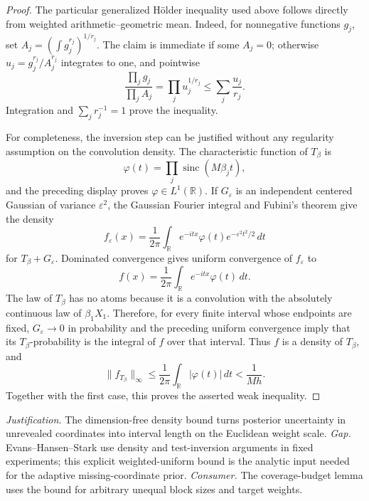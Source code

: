\documentclass{article}
\begin{document}
\begin{proof}
The particular generalized H\"older inequality used above follows directly from weighted arithmetic--geometric mean.  Indeed, for nonnegative functions \(g_j\), set \(A_j=(\int g_j^{r_j})^{1/r_j}\).  The claim is immediate if some \(A_j=0\); otherwise \(u_j=g_j^{r_j}/A_j^{r_j}\) integrates to one, and pointwise
\[
 \frac{\prod_jg_j}{\prod_jA_j}
 =\prod_ju_j^{1/r_j}
 \le\sum_j\frac{u_j}{r_j}.
\]
Integration and \(\sum_jr_j^{-1}=1\) prove the inequality.

For completeness, the inversion step can be justified without any regularity assumption on the convolution density.  The characteristic function of \(T_\beta\) is
\[
 \varphi(t)=\prod_j\operatorname{sinc}(M\beta_jt),
\]
and the preceding display proves \(\varphi\in L^1(\mathbb R)\).  If \(G_\varepsilon\) is an independent centered Gaussian of variance \(\varepsilon^2\), the Gaussian Fourier integral and Fubini's theorem give the density
\[
 f_\varepsilon(x)=\frac1{2\pi}\int_{\mathbb R}
 e^{-itx}\varphi(t)e^{-\varepsilon^2t^2/2}\,dt
\]
for \(T_\beta+G_\varepsilon\).  Dominated convergence gives uniform convergence of \(f_\varepsilon\) to
\[
 f(x)=\frac1{2\pi}\int_{\mathbb R}e^{-itx}\varphi(t)\,dt.
\]
The law of \(T_\beta\) has no atoms because it is a convolution with the absolutely continuous law of \(\beta_1X_1\).  Therefore, for every finite interval whose endpoints are fixed, \(G_\varepsilon\to0\) in probability and the preceding uniform convergence imply that its \(T_\beta\)-probability is the integral of \(f\) over that interval.  Thus \(f\) is a density of \(T_\beta\), and
\[
 \|f_{T_\beta}\|_\infty
 \le \frac1{2\pi}\int_{\mathbb R}|\varphi(t)|\,dt
 <\frac1{Mh}.
\]
Together with the first case, this proves the asserted weak inequality.
\end{proof}
\par\smallskip\noindent \textit{Justification.} The dimension-free density bound turns posterior uncertainty in unrevealed coordinates into interval length on the Euclidean weight scale. \textit{Gap.} Evans--Hansen--Stark use density and test-inversion arguments in fixed experiments; this explicit weighted-uniform bound is the analytic input needed for the adaptive missing-coordinate prior. \textit{Consumer.} The coverage-budget lemma uses the bound for arbitrary unequal block sizes and target weights.
\end{document}
